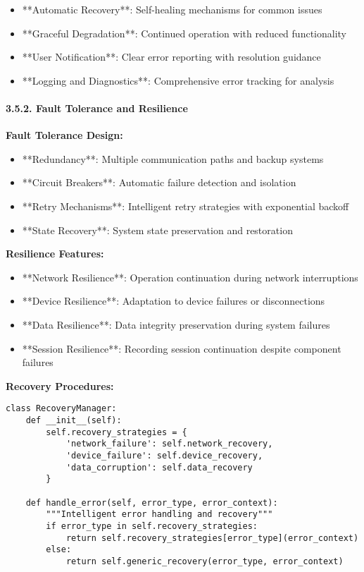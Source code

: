 \documentclass[11pt,a4paper]{article}
\begin{document}
\begin{itemize}
\item **Automatic Recovery**: Self-healing mechanisms for common issues
\item **Graceful Degradation**: Continued operation with reduced functionality
\item **User Notification**: Clear error reporting with resolution guidance
\item **Logging and Diagnostics**: Comprehensive error tracking for analysis

\end{itemize}
\paragraph{3.5.2. Fault Tolerance and Resilience}

\textbf{Fault Tolerance Design:}

\begin{itemize}
\item **Redundancy**: Multiple communication paths and backup systems
\item **Circuit Breakers**: Automatic failure detection and isolation
\item **Retry Mechanisms**: Intelligent retry strategies with exponential backoff
\item **State Recovery**: System state preservation and restoration

\end{itemize}
\textbf{Resilience Features:}

\begin{itemize}
\item **Network Resilience**: Operation continuation during network interruptions
\item **Device Resilience**: Adaptation to device failures or disconnections
\item **Data Resilience**: Data integrity preservation during system failures
\item **Session Resilience**: Recording session continuation despite component failures

\end{itemize}
\textbf{Recovery Procedures:}

\begin{verbatim}
class RecoveryManager:
    def __init__(self):
        self.recovery_strategies = {
            'network_failure': self.network_recovery,
            'device_failure': self.device_recovery,
            'data_corruption': self.data_recovery
        }

    def handle_error(self, error_type, error_context):
        """Intelligent error handling and recovery"""
        if error_type in self.recovery_strategies:
            return self.recovery_strategies[error_type](error_context)
        else:
            return self.generic_recovery(error_type, error_context)
\end{verbatim}
\end{document}

